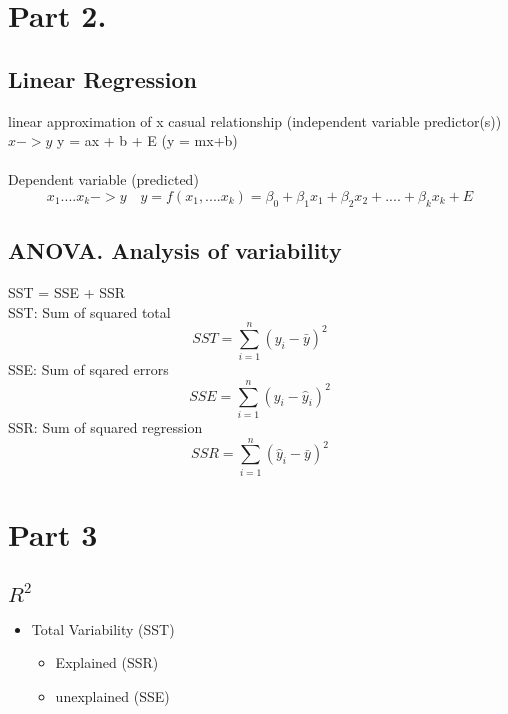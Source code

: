 \documentclass{article}
\begin{document}
\section{Part 2.}
\subsection{Linear Regression}
linear approximation of x casual relationship (independent variable predictor(s))\\
$x->y$ \quad\quad y = ax + b + E (y = mx+b)\\ \\
Dependent variable (predicted)\\
\[x_1....x_k -> y \quad y = f(x_1,....x_k) = \beta_0 + \beta_1x_1+\beta_2x_2+....+\beta_kx_k + E\]
\subsection{ANOVA. Analysis of variability}

SST = SSE + SSR\\
SST: Sum of squared total\\
\[SST=\sum^n_{i=1}(y_i-\bar{y})^2\]
SSE: Sum of sqared errors\\
\[SSE=\sum^n_{i=1}(y_i-\hat{y}_i)^2\]
SSR: Sum of squared regression\\
\[SSR=\sum^n_{i=1}(\hat{y}_i-\bar{y})^2\]

\section{Part 3}
\subsection{$R^2$}
\begin{itemize}
    \item Total Variability (SST)
    \begin{itemize}
        \item Explained (SSR)
        \item unexplained (SSE)
    \end{itemize}
\end{itemize}
\end{document}
